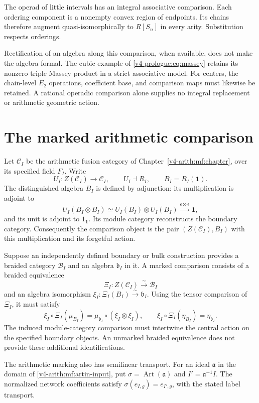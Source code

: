 The operad of little intervals has an integral associative
comparison. Each ordering component is a nonempty convex
region of endpoints. Its chains therefore augment
quasi-isomorphically to $R[S_n]$ in every arity.
Substitution respects orderings.

Rectification of an algebra along this comparison,
when available, does not make the algebra formal.
The cubic example of
\eqref{v4-prologue:eq:massey} retains its nonzero triple
Massey product in a strict associative model.
For centers, the chain-level $E_2$ operations, coefficient
base, and comparison maps must likewise be retained.
A rational operadic comparison alone supplies no
integral replacement or arithmetic geometric action.

\section{The marked arithmetic comparison}
\label{v4-arith:centers:sec:marked-comparison}

Let $\mathcal C_I$ be the arithmetic fusion category of
Chapter~\ref{v4-arith:mf:chapter}, over its specified field
$F_I$. Write
\[
 U_I:Z(\mathcal C_I)\longrightarrow\mathcal C_I,
 \qquad U_I\dashv R_I,\qquad
 B_I=R_I(\mathbf1).
\]
The distinguished algebra $B_I$ is defined by adjunction:
its multiplication is adjoint to
\[
 U_I(B_I\otimes B_I)
 \simeq U_I(B_I)\otimes U_I(B_I)
 \xrightarrow{\epsilon\otimes\epsilon}\mathbf1,
\]
and its unit is adjoint to $1_{\mathbf1}$.
Its module category reconstructs the boundary category.
Consequently the comparison object is the pair
$(Z(\mathcal C_I),B_I)$ with this multiplication and
its forgetful action.

Suppose an independently defined boundary or bulk construction
provides a braided category $\mathcal B_I$ and an algebra
$\mathfrak b_I$ in it. A marked comparison consists of
a braided equivalence
\[
 \Xi_I:Z(\mathcal C_I)\xrightarrow{\sim}\mathcal B_I
\]
and an algebra isomorphism
$\xi_I:\Xi_I(B_I)\xrightarrow{\sim}\mathfrak b_I$.
Using the tensor comparison of $\Xi_I$, it must satisfy
\[
 \xi_I\circ\Xi_I(\mu_{B_I})
 =\mu_{\mathfrak b_I}\circ(\xi_I\otimes\xi_I),
 \qquad
 \xi_I\circ\Xi_I(\eta_{B_I})=\eta_{\mathfrak b_I}.
\]
The induced module-category comparison must intertwine
the central action on the specified boundary objects.
An unmarked braided equivalence does not provide these
additional identifications.

The arithmetic marking also has semilinear transport.
For an ideal $\mathfrak a$ in the domain of
\eqref{v4-arith:mf:artin-input}, put
$\sigma=\operatorname{Art}(\mathfrak a)$ and
$I'=\mathfrak a^{-1}I$.
The normalized network coefficients satisfy
$\sigma(e_{I,g})=e_{I',g}$, with the stated label transport.

